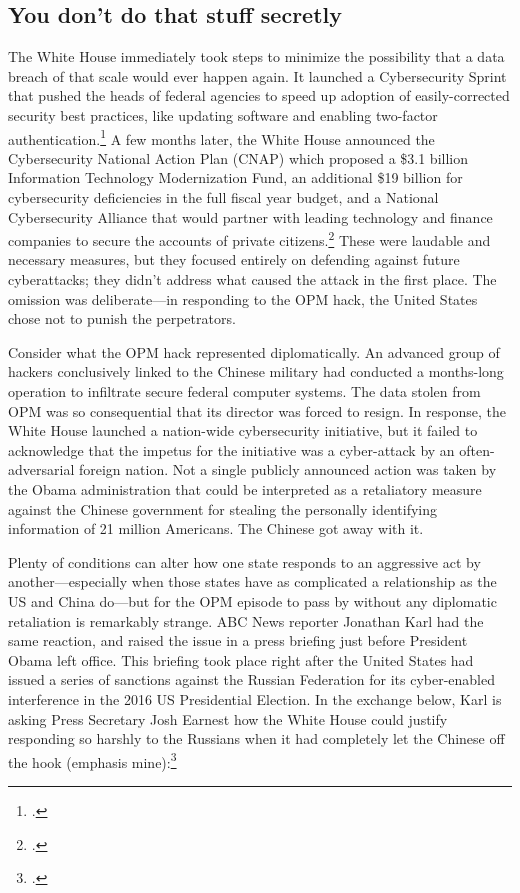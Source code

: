 \documentclass{memoir}
\begin{document}
\begin{refsegment}
\subsection{You don't do that stuff secretly}
The White House immediately took steps to minimize the possibility that a data breach of that scale would ever happen again. It launched a Cybersecurity Sprint that pushed the heads of federal agencies to speed up adoption of easily-corrected security best practices, like updating software and enabling two-factor authentication.\footcite{koerner_inside_2016} A few months later, the White House announced the Cybersecurity National Action Plan (CNAP) which proposed a \$3.1 billion Information Technology Modernization Fund, an additional \$19 billion for cybersecurity deficiencies in the full fiscal year budget, and a National Cybersecurity Alliance that would partner with leading technology and finance companies to secure the accounts of private citizens.\footcite{the_white_house_fact_2016} These were laudable and necessary measures, but they focused entirely on defending against future cyberattacks; they didn't address what caused the attack in the first place. The omission was deliberate---in responding to the OPM hack, the United States chose not to punish the perpetrators.

Consider what the OPM hack represented diplomatically. An advanced group of hackers conclusively linked to the Chinese military had conducted a months-long operation to infiltrate secure federal computer systems. The data stolen from OPM was so consequential that its director was forced to resign. In response, the White House launched a nation-wide cybersecurity initiative, but it failed to acknowledge that the impetus for the initiative was a cyber-attack by an often-adversarial foreign nation. Not a single publicly announced action was taken by the Obama administration that could be interpreted as a retaliatory measure against the Chinese government for stealing the personally identifying information of 21 million Americans. The Chinese got away with it.

Plenty of conditions can alter how one state responds to an aggressive act by another---especially when those states have as complicated a relationship as the US and China do---but for the OPM episode to pass by without any diplomatic retaliation is remarkably strange. ABC News reporter Jonathan Karl had the same reaction, and raised the issue in a press briefing just before President Obama left office. This briefing took place right after the United States had issued a series of sanctions against the Russian Federation for its cyber-enabled interference in the 2016 US Presidential Election. In the exchange below, Karl is asking Press Secretary Josh Earnest how the White House could justify responding so harshly to the Russians when it had completely let the Chinese off the hook (emphasis mine):\footcite[You can watch the full exchange via video here. It's pretty awkward.]{gill_earnest_2017}


\end{refsegment}
\end{document}
